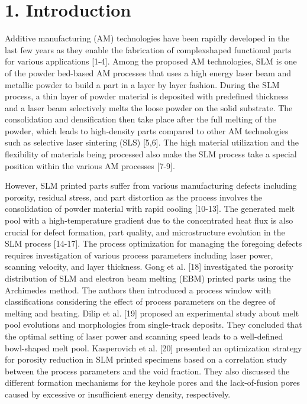 \documentclass[10pt]{article}
\begin{document}
\section*{1. Introduction}
Additive manufacturing (AM) technologies have been rapidly developed in the last few years as they enable the fabrication of complexshaped functional parts for various applications [1-4]. Among the proposed AM technologies, SLM is one of the powder bed-based AM processes that uses a high energy laser beam and metallic powder to build a part in a layer by layer fashion. During the SLM process, a thin layer of powder material is deposited with predefined thickness and a laser beam selectively melts the loose powder on the solid substrate. The consolidation and densification then take place after the full melting of the powder, which leads to high-density parts compared to other AM technologies such as selective laser sintering (SLS) [5,6]. The high material utilization and the flexibility of materials being processed also make the SLM process take a special position within the various AM processes [7-9].

However, SLM printed parts suffer from various manufacturing defects including porosity, residual stress, and part distortion as the process involves the consolidation of powder material with rapid cooling [10-13]. The generated melt pool with a high-temperature gradient due to the concentrated heat flux is also crucial for defect formation, part quality, and microstructure evolution in the SLM process [14-17]. The process optimization for managing the foregoing defects requires investigation of various process parameters including laser power, scanning velocity, and layer thickness. Gong et al. [18] investigated the porosity distribution of SLM and electron beam melting (EBM) printed parts using the Archimedes method. The authors then introduced a process window with classifications considering the effect of process parameters on the degree of melting and heating. Dilip et al. [19] proposed an experimental study about melt pool evolutions and morphologies from single-track deposits. They concluded that the optimal setting of laser power and scanning speed leads to a well-defined bowl-shaped melt pool. Kasperovich et al. [20] presented an optimization strategy for porosity reduction in SLM printed specimens based on a correlation study between the process parameters and the void fraction. They also discussed the different formation mechanisms for the keyhole pores and the lack-of-fusion pores caused by excessive or insufficient energy density, respectively.
\end{document}
